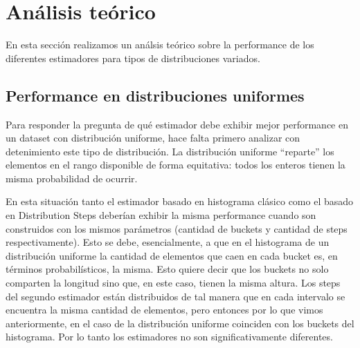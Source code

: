 \section{Análisis teórico}
En esta sección realizamos un análsis teórico sobre la performance de los diferentes estimadores para tipos de distribuciones variados.

\subsection{Performance en distribuciones uniformes}
Para responder la pregunta de qué estimador debe exhibir mejor performance en un dataset con distribución uniforme, hace falta primero analizar con detenimiento este tipo de distribución. La distribución uniforme ``reparte'' los elementos en el rango disponible de forma equitativa: todos los enteros tienen la misma probabilidad de ocurrir.


En esta situación tanto el estimador basado en histograma clásico como el basado en Distribution Steps deberían exhibir la misma performance cuando son construidos con los mismos parámetros (cantidad de buckets y cantidad de steps respectivamente). Esto se debe, esencialmente, a que en el histograma de un distribución uniforme la cantidad de elementos que caen en cada bucket es, en términos probabilísticos, la misma. Esto quiere decir que los buckets no solo comparten la longitud sino que, en este caso, tienen la misma altura. Los steps del segundo estimador están distribuidos de tal manera que en cada intervalo se encuentra la misma cantidad de elementos, pero entonces por lo que vimos anteriormente, en el caso de la distribución uniforme coinciden con los buckets del histograma. Por lo tanto los estimadores no son significativamente diferentes.

